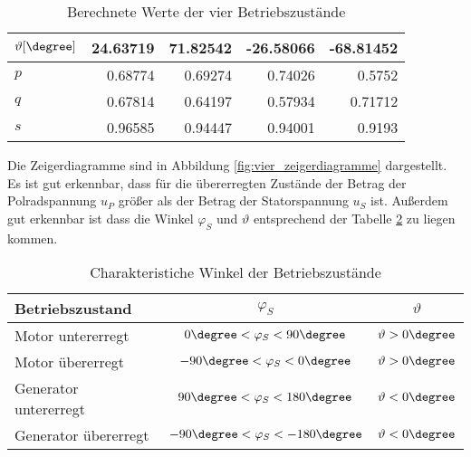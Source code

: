 \begin{table}[!ht]
\begin{tabular}{|l|r|r|r|r|}
    $\vartheta [\degree]$         & 24.63719      & 71.82542       & -26.58066       & -68.81452        \\ \hline
    $p$                           & 0.68774       & 0.69274        & 0.74026         & 0.5752           \\ \hline
    $q$                           & 0.67814       & 0.64197        & 0.57934         & 0.71712          \\ \hline
    $s$                           & 0.96585       & 0.94447        & 0.94001         & 0.9193           \\ \hline
    \end{tabular}
    \caption{Berechnete Werte der vier Betriebszustände}
    \label{tab:berechnete_werte_betrzustaende}
\end{table}
%
Die Zeigerdiagramme sind in Abbildung \ref{fig:vier_zeigerdiagramme} dargestellt. Es ist gut erkennbar, dass für die übererregten Zustände der Betrag der Polradspannung $u_P$ größer als der Betrag der Statorspannung $u_S$ ist. Außerdem gut erkennbar ist dass die Winkel $\varphi_S$ und $\vartheta$ entsprechend der Tabelle \ref{tab:charak_winkel_bertzust} zu liegen kommen.

\begin{table}[]
\centering
    \begin{tabular}{|l|c|c|}
    \hline
    \textbf{Betriebszustand}                  & $\varphi_S$                        & $\vartheta$            \\ \hline
    Motor untererregt                         & $0\degree<\varphi_S<90\degree$     & $\vartheta > 0\degree$ \\ \hline
    Motor übererregt                          & $-90\degree<\varphi_S<0\degree$    & $\vartheta > 0\degree$ \\ \hline
    Generator untererregt                     & $90\degree<\varphi_S<180\degree$   & $\vartheta < 0\degree$ \\ \hline
    Generator übererregt                      & $-90\degree<\varphi_S<-180\degree$ & $\vartheta < 0\degree$ \\ \hline
    \end{tabular}
    \caption{Charakteristiche Winkel der Betriebszustände}
    \label{tab:charak_winkel_bertzust}
\end{table}


